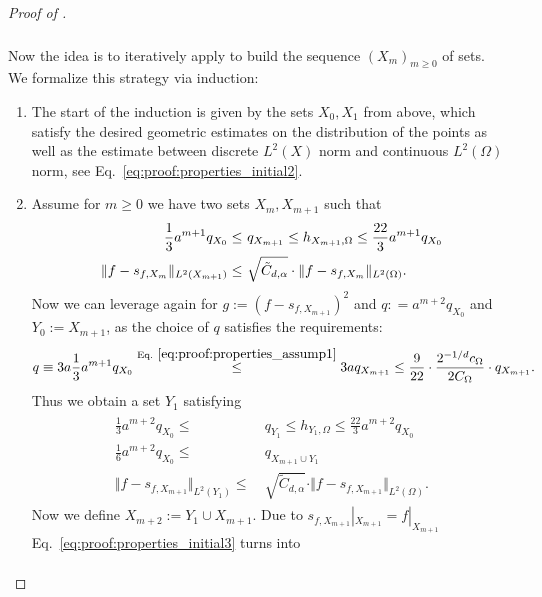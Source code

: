 \documentclass[a4paper, 10pt]{article}
\begin{document}
\begin{proof}[Proof of ]
\begin{align}
\begin{aligned}
\end{aligned}
\end{align}
Now the idea is to iteratively apply  to build the sequence $(X_m)_{m \geq 0}$ of sets. \\ 
We formalize this strategy via induction: 
\begin{enumerate}
\item The start of the induction is given by the sets $X_{0}, X_{1}$ from above, 
which satisfy the desired geometric estimates on the distribution of the points as well as the estimate between discrete $L^2(X)$ norm and continuous $L^2(\Omega)$ norm, 
see Eq.~\eqref{eq:proof:properties_initial2}.
\item Assume for $m \geq 0$ we have two sets $X_{m}, X_{m+1}$ such that 
\begin{align}
\frac{1}{3} a^{m+1} q_{X_{0}} \leq& ~ q_{X_{m+1}} \leq h_{X_{m + 1}, \Omega} \leq \frac{22}{3} a^{m+1} q_{X_{0}} \label{eq:proof:properties_assump1} \\
%
\Vert f - s_{f, X_{m}} \Vert_{L^2(X_{m + 1})} \leq& ~ \sqrt{\tilde{C}_{d, \alpha}} \cdot \Vert f - s_{f, X_{m}} \Vert_{L^2(\Omega)}. \notag %
\end{align}
Now we can leverage again  for $g := (f - s_{f, X_{m+1}})^2$ and $q: = a^{m+2} q_{X_0}$ and $Y_0 := X_{m+1}$, as the choice of $q$ satisfies the requirements:
\begin{align*}
q \equiv 3a \frac{1}{3} a^{m+1} q_{X_0} \stackrel{\text{Eq.}~\eqref{eq:proof:properties_assump1}}{\leq} 3a q_{X_{m+1}} \leq \frac{9}{22} \cdot \frac{2^{-1/d} c_\Omega}{2C_\Omega} \cdot q_{X_{m+1}}.
\end{align*}
Thus we obtain a set $Y_1$ satisfying
\begin{align}
\begin{aligned}
\label{eq:proof:properties_initial3}
\frac{1}{3} a^{m+2} q_{X_0} \leq& ~ q_{Y_1} \leq h_{Y_1, \Omega} \leq \frac{22}{3} a ^{m+2} q_{X_0} \\
\frac{1}{6} a^{m+2} q_{X_0} \leq& ~ q_{X_{m+1} \cup Y_1} \\
\Vert f - s_{f, X_{m+1}} \Vert_{L^2(Y_1)} \leq& ~ \sqrt{\tilde{C}_{d, \alpha}} \cdot \Vert f - s_{f, X_{m+1}} \Vert_{L^2(\Omega)}. 
\end{aligned}
\end{align}
Now we define $X_{m+2} := Y_1 \cup X_{m+1}$.
Due to $s_{f, X_{m+1}}|_{X_{m+1}} = f|_{X_{m+1}}$ Eq.~\eqref{eq:proof:properties_initial3} turns into
\begin{align*}

\end{align*}
\end{enumerate}
\end{proof}
\end{document}

